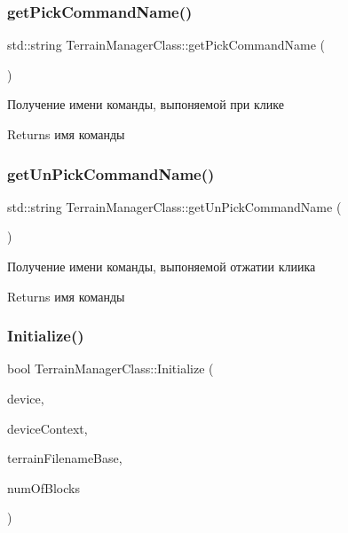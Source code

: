 \subsubsection{\texorpdfstring{get\+Pick\+Command\+Name()}{getPickCommandName()}}
{\footnotesize\ttfamily std\+::string Terrain\+Manager\+Class\+::get\+Pick\+Command\+Name (\begin{DoxyParamCaption}{ }\end{DoxyParamCaption})}



Получение имени команды, выпоняемой при клике 

\begin{DoxyReturn}{Returns}
имя команды 
\end{DoxyReturn}
\mbox{\label{class_terrain_manager_class_a050bcf5aeb0a9cf73434144894867abc}} 
\subsubsection{\texorpdfstring{get\+Un\+Pick\+Command\+Name()}{getUnPickCommandName()}}
{\footnotesize\ttfamily std\+::string Terrain\+Manager\+Class\+::get\+Un\+Pick\+Command\+Name (\begin{DoxyParamCaption}{ }\end{DoxyParamCaption})}



Получение имени команды, выпоняемой отжатии клиика 

\begin{DoxyReturn}{Returns}
имя команды 
\end{DoxyReturn}
\mbox{\label{class_terrain_manager_class_a99bad53700f5665b05cf7fa09765c6c6}} 
\subsubsection{\texorpdfstring{Initialize()}{Initialize()}}
{\footnotesize\ttfamily bool Terrain\+Manager\+Class\+::\+Initialize (\begin{DoxyParamCaption}\item[{I\+D3\+D11\+Device $\ast$}]{device,  }\item[{I\+D3\+D11\+Device\+Context $\ast$}]{device\+Context,  }\item[{std\+::string}]{terrain\+Filename\+Base,  }\item[{int}]{num\+Of\+Blocks }\end{DoxyParamCaption})}

